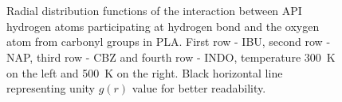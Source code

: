 \begin{figure}[H]
	\\
	\vspace{-0.2cm}
	\\
	\vspace{-0.4cm}
	\caption{Radial distribution functions of the interaction between API hydrogen atoms participating at hydrogen bond and the oxygen atom from carbonyl groups in PLA. First row - IBU, second row - NAP, third row - CBZ and fourth row - INDO, temperature 300~K on the left and 500~K on the right. Black horizontal line representing unity $g(r)$ value for better readability.}
	\label{fig:carbonyl}
\end{figure}

